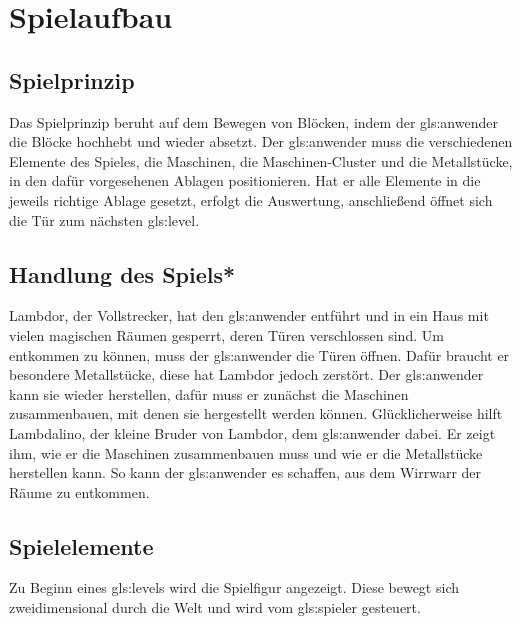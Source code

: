 \documentclass{scrartcl}
\begin{document}

\section{Spielaufbau}

\subsection{Spielprinzip}
Das Spielprinzip beruht auf dem Bewegen von Blöcken, indem der \gls{gls:anwender} die Blöcke hochhebt und wieder absetzt. Der \gls{gls:anwender} muss die verschiedenen Elemente des Spieles, die Maschinen, die Maschinen-Cluster und die Metallstücke, in den dafür vorgesehenen Ablagen positionieren. Hat er alle Elemente in die jeweils richtige Ablage gesetzt, erfolgt die Auswertung, anschließend öffnet sich die Tür zum nächsten \gls{gls:level}.

\subsection{Handlung des Spiels*} \label{subsection:Story}
Lambdor, der Vollstrecker, hat den \gls{gls:anwender} entführt und in ein Haus mit vielen magischen Räumen gesperrt, deren Türen verschlossen sind. Um entkommen zu können, muss der \gls{gls:anwender} die Türen öffnen. Dafür braucht er besondere Metallstücke, diese hat Lambdor jedoch zerstört. Der \gls{gls:anwender} kann sie wieder herstellen, dafür muss er zunächst die Maschinen zusammenbauen, mit denen sie hergestellt werden können. Glücklicherweise hilft Lambdalino, der kleine Bruder von Lambdor, dem \gls{gls:anwender} dabei. Er zeigt ihm, wie er die Maschinen zusammenbauen muss und wie er die Metallstücke herstellen kann. So kann der \gls{gls:anwender} es schaffen, aus dem Wirrwarr der Räume zu entkommen.


\subsection{Spielelemente}

Zu Beginn eines \glspl{gls:level} wird die Spielfigur angezeigt. Diese bewegt sich zweidimensional durch die Welt und wird vom \gls{gls:spieler} gesteuert.
\end{document}
